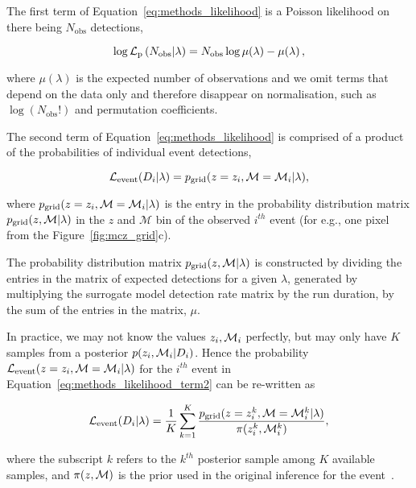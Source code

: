 \documentclass[twocolumn]{aastex631}
\begin{document}
The first term of Equation~\ref{eq:methods_likelihood} is a Poisson likelihood on there being $N_\mathrm{obs}$ detections,

\begin{equation}
  \log{ \Lp\left(N_{\mathrm{obs}}|\lambda\right)} =  N_{\mathrm{obs}}\log\mu(\lambda)- \mu(\lambda)\, ,
  \label{eq:methods_likelihood_term1}
\end{equation}

where $\mu(\lambda)$ is the expected number of observations and we omit terms that depend on the data only and therefore disappear on normalisation, such as $\log(N_{\mathrm{obs}}!)$ and permutation coefficients.

The second term of Equation~\ref{eq:methods_likelihood} is comprised of a product of the probabilities of individual event detections,

\begin{equation}
  \Le(D_i|\lambda) = \pg(z=z_i,\mathcal{M}=\mathcal{M}_{i}|\lambda),
  \label{eq:methods_likelihood_term2}
\end{equation}

\bigskip\noindent
where $p_{\rm grid}(z=z_i,\mathcal{M}=\mathcal{M}_{i}|\lambda)$ is the entry in the probability distribution matrix $p_{\rm grid}(z,\mathcal{M}|\lambda)$ in the $z$ and $\mathcal{M}$ bin of the observed $i^{th}$ event (for e.g., one pixel from the Figure~\ref{fig:mcz_grid}c).

The probability distribution matrix $p_{\rm grid}(z,\mathcal{M}|\lambda)$ is constructed by dividing the entries in the matrix of expected detections for a given $\lambda$, generated by multiplying the surrogate model detection rate matrix by the run duration, by the sum of the entries in the matrix, $\mu$.




 In practice, we may not know the values $z_i, \mathcal{M}_{i}$ perfectly,  but may only have $K$ samples from a posterior $p(z_i,\mathcal{M}_{i}|D_i)$.
 Hence the probability $\mathcal{L}_{\rm event}(z=z_i,\mathcal{M}=\mathcal{M}_{i}|\lambda)$ for the  $i^{th}$ event in Equation~\ref{eq:methods_likelihood_term2} can be re-written as 

\begin{equation}
  \Le(D_i|\lambda) = \frac{1}{K} \sum_{k=1}^K \frac{\pg(z=z_i^k, \Mc=\Mc_{i}^k|\lambda)}{\pi(z_i^k,\Mc_i^k)},
  \label{eq:methods_likelihood_term2_LIGO}
\end{equation}

\bigskip\noindent
where the subscript $k$ refers to the $k^{th}$ posterior sample among $K$ available samples, and $\pi(z,\mathcal{M})$ is the prior used in the original inference for the event~\citep[see, e.g.][]{Mandel_2019}.
\end{document}
